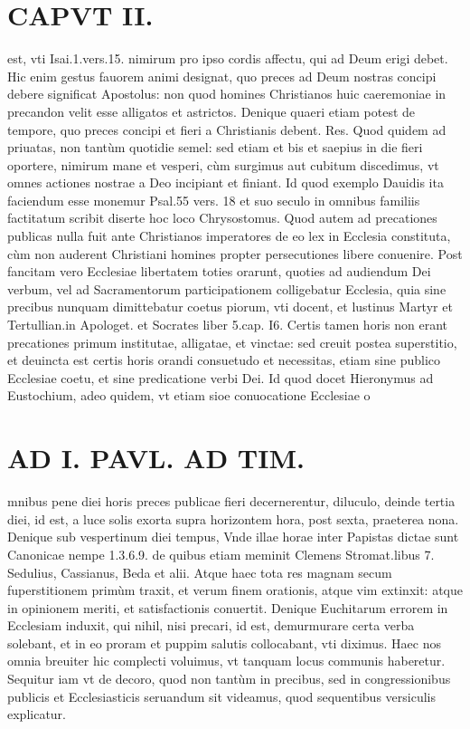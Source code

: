 \documentclass{article}
\begin{document}
\begin{pages}
\section*{CAPVT II. }
\marginpar{[ p.75 ]}\pstart est, vti Isai.1.vers.15. nimirum pro ipso cordis affectu, qui ad Deum erigi debet. Hic enim gestus fauorem animi designat, quo preces ad Deum nostras concipi debere significat Apostolus: non quod homines Christianos huic caeremoniae in precandon velit esse alligatos et astrictos.  \pend\pstart Denique quaeri etiam potest de tempore, quo preces concipi et fieri a Christianis debent. Res. Quod quidem ad priuatas, non tantùm quotidie semel: sed etiam et bis et saepius in die fieri oportere, nimirum mane et vesperi, cùm surgimus aut cubitum discedimus, vt omnes actiones nostrae a Deo incipiant et finiant. Id quod exemplo Dauidis ita faciendum esse monemur Psal.55 vers. 18 et suo seculo in omnibus familiis factitatum scribit diserte hoc loco Chrysostomus. Quod autem ad precationes publicas nulla fuit ante Christianos imperatores de eo lex in Ecclesia constituta, cùm non auderent Christiani homines propter persecutiones libere conuenire. Post fancitam vero Ecclesiae libertatem toties orarunt, quoties ad audiendum Dei verbum, vel ad Sacramentorum participationem colligebatur Ecclesia, quia sine precibus nunquam dimittebatur coetus piorum, vti docent, et lustinus Martyr et Tertullian.in Apologet. et Socrates liber 5.cap. I6. Certis tamen horis non erant precationes primum institutae, alligatae, et vinctae: sed creuit postea superstitio, et deuincta est certis horis orandi consuetudo et necessitas, etiam sine publico Ecclesiae coetu, et sine predicatione verbi Dei. Id quod docet Hieronymus ad Eustochium, adeo quidem, vt etiam sioe conuocatione Ecclesiae o\pend
\section*{AD I. PAVL. AD TIM. }
\marginpar{[ p.76 ]}\pstart mnibus pene diei horis preces publicae fieri decernerentur, diluculo, deinde tertia diei, id est, a luce solis exorta supra horizontem hora, post sexta, praeterea nona. Denique sub vespertinum diei tempus, Vnde illae horae inter Papistas dictae sunt Canonicae nempe 1.3.6.9. de quibus etiam meminit Clemens Stromat.libus 7. Sedulius, Cassianus, Beda et alii. Atque haec tota res magnam secum fuperstitionem primùm traxit, et verum finem orationis, atque vim extinxit: atque in opinionem meriti, et satisfactionis conuertit. Denique Euchitarum errorem in Ecclesiam induxit, qui nihil, nisi precari, id est, demurmurare certa verba solebant, et in eo proram et puppim salutis collocabant, vti diximus. Haec nos omnia breuiter hic complecti voluimus, vt tanquam locus communis haberetur. Sequitur iam vt de decoro, quod non tantùm in precibus, sed in congressionibus publicis et Ecclesiasticis seruandum sit videamus, quod sequentibus versiculis explicatur.  \pend
{}
{}

\end{pages}
\end{document}
